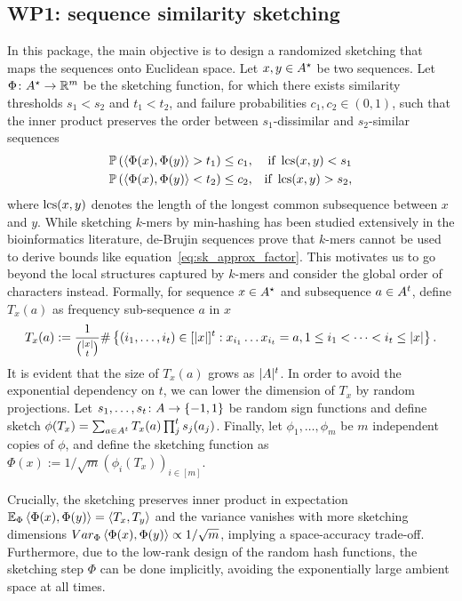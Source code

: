 

\subsection{WP1: sequence similarity sketching}
In this package, the main objective is to design a randomized sketching that maps the sequences onto Euclidean space. 
Let $x,y\in A^\star$ be two sequences. Let $\Phi\colon A^\star\to \mathbb{R}^m$ be the sketching function, for which there exists similarity thresholds $s_1< s_2$ and $t_1 < t_2$, and failure probabilities $c_1,c_2\in(0,1)$, such that the inner product preserves the order between $s_1$-dissimilar and $s_2$-similar sequences 
\begin{align}
\label{eq:sk_approx_factor}
\mathbb{P}\left( \left\langle \Phi(x), \Phi(y) \right\rangle > t_1  \right)\le c_1, && \text{if } \operatorname{\mathrm{lcs}}(x,y)< s_1 \\
\mathbb{P}\left( \left\langle \Phi(x), \Phi(y) \right\rangle < t_2  \right)\le c_2, && \text{if } \operatorname{\mathrm{lcs}}(x,y)>s_2, 
\end{align}
where $\operatorname{\mathrm{lcs}}(x,y)$ denotes the length of the longest common subsequence between $x$ and $y$.
While sketching $k$-mers by min-hashing has been studied extensively in the bioinformatics literature, de-Brujin sequences prove that $k$-mers cannot be used to derive bounds like equation~\eqref{eq:sk_approx_factor}. This motivates us to go beyond the local structures captured by $k$-mers and consider the global order of characters instead. Formally, for sequence $x\in A^\star$ and subsequence $a\in A^t$, define $T_x(a)$ as frequency sub-sequence $a$ in $x$ 
\begin{align}
 T_x(a):=\frac{1}{\binom{|x|}{t}}\#\left\{(i_1,\dots,i_t)\in[|x|]^t: x_{i_1}\dots x_{i_t}=a, 1\le i_1<\dots<i_t\le |x|\right\}.
\end{align}
It is evident that the size of $T_x(a)$ grows as $| A|^t$. In order to avoid the exponential dependency on $t$, we can lower the dimension of $T_x$ by random projections. Let $s_1,\dots, s_t\colon A\to\left\{-1,1\right\}$ be random sign functions and define sketch $\phi(T_x)=\sum_{a\in A^t} T_x(a)\prod_j^t s_j(a_j)$. Finally, let $\phi_1, \dots, \phi_m$ be $m$ independent copies of $\phi$, and define the sketching function as $\Phi(x):=1/\sqrt{m}(\phi_i(T_x))_{i\in[m]}$. 

Crucially, the sketching preserves inner product in expectation $\mathbb{E}_\Phi \left\langle \Phi(x), \Phi(y) \right\rangle = \left\langle T_x, T_y \right\rangle$ and the variance vanishes with more sketching dimensions $Var_\Phi \left\langle \Phi(x), \Phi(y) \right\rangle\propto 1/\sqrt{m}$, implying a space-accuracy trade-off. Furthermore, due to the low-rank design of the random hash functions, the sketching step $\Phi$ can be done implicitly, avoiding the exponentially large ambient space at all times. 

